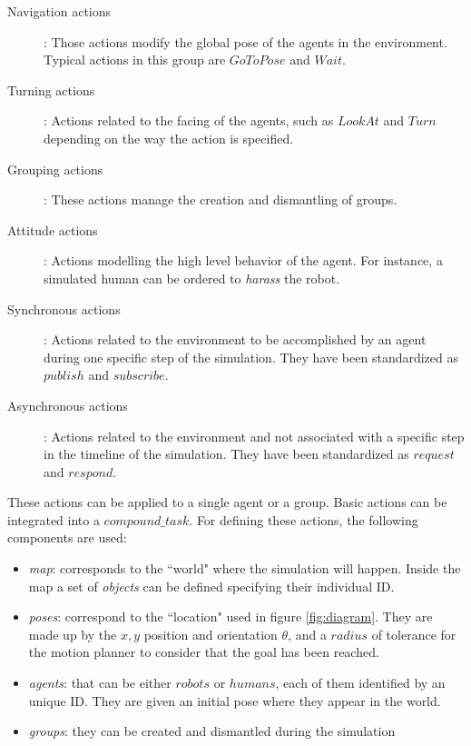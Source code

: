 \begin{description}
    \item[Navigation actions]: Those actions modify the global pose of the agents in the environment. Typical actions in this group are $GoToPose$ and $Wait$.
    \item[Turning actions]: Actions related to the facing of the agents, such as $LookAt$ and $Turn$ depending on the way the action is specified.
    \item[Grouping actions]: These actions manage the creation and dismantling of groups.
    \item[Attitude actions]: Actions modelling the high level behavior of the agent. For instance, a simulated human can be ordered to \textit{harass} the robot.
    \item[Synchronous actions]: Actions related to the environment to be accomplished by an agent during one specific step of the simulation. They have been standardized as $publish$ and $subscribe$.
    \item[Asynchronous actions]: Actions related to the environment and not associated with a specific step in the timeline of the simulation. They have been standardized as $request$ and $respond$.
\end{description}

These actions can be applied to a single agent or a group. Basic actions can be integrated into a $compound\_task$. For defining these actions, the following components are used:
\begin{itemize}
    \item \emph{map}: corresponds to the ``world" where the simulation will happen. Inside the map a set of \emph{objects} can be defined specifying their individual ID.
    \item \emph{poses}: correspond to the ``location" used in figure \ref{fig:diagram}. They are made up by the $x,y$ position and orientation $\theta$, and a $radius$ of tolerance for the motion planner to consider that the goal has been reached.
    \item \emph{agents}: that can be either $robots$ or $humans$, each of them identified by an unique ID. They are given an initial pose where they appear in the world.
    \item \emph{groups}: they can be created and dismantled during the simulation
\end{itemize}

